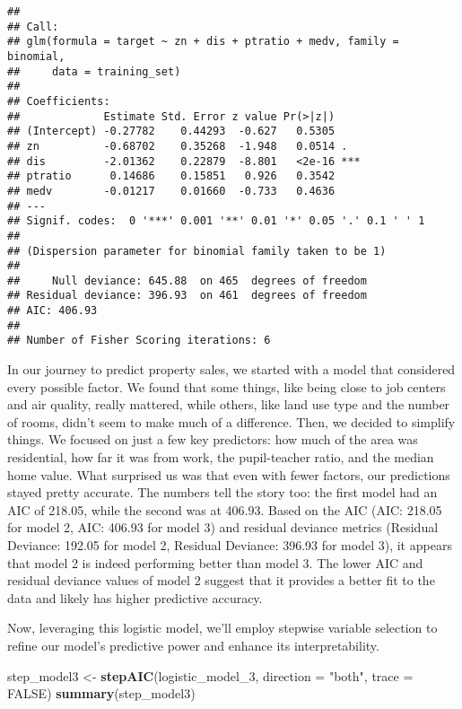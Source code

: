 \documentclass[
]{article}
\newenvironment{Shaded}{\begin{snugshade}}{\end{snugshade}}
\newcommand{\AttributeTok}[1]{\textcolor[rgb]{0.13,0.29,0.53}{#1}}
\newcommand{\ConstantTok}[1]{\textcolor[rgb]{0.56,0.35,0.01}{#1}}
\newcommand{\FunctionTok}[1]{\textcolor[rgb]{0.13,0.29,0.53}{\textbf{#1}}}
\newcommand{\NormalTok}[1]{#1}
\newcommand{\OtherTok}[1]{\textcolor[rgb]{0.56,0.35,0.01}{#1}}
\newcommand{\StringTok}[1]{\textcolor[rgb]{0.31,0.60,0.02}{#1}}
\begin{document}
\begin{verbatim}
## 
## Call:
## glm(formula = target ~ zn + dis + ptratio + medv, family = binomial, 
##     data = training_set)
## 
## Coefficients:
##             Estimate Std. Error z value Pr(>|z|)    
## (Intercept) -0.27782    0.44293  -0.627   0.5305    
## zn          -0.68702    0.35268  -1.948   0.0514 .  
## dis         -2.01362    0.22879  -8.801   <2e-16 ***
## ptratio      0.14686    0.15851   0.926   0.3542    
## medv        -0.01217    0.01660  -0.733   0.4636    
## ---
## Signif. codes:  0 '***' 0.001 '**' 0.01 '*' 0.05 '.' 0.1 ' ' 1
## 
## (Dispersion parameter for binomial family taken to be 1)
## 
##     Null deviance: 645.88  on 465  degrees of freedom
## Residual deviance: 396.93  on 461  degrees of freedom
## AIC: 406.93
## 
## Number of Fisher Scoring iterations: 6
\end{verbatim}

In our journey to predict property sales, we started with a model that
considered every possible factor. We found that some things, like being
close to job centers and air quality, really mattered, while others,
like land use type and the number of rooms, didn't seem to make much of
a difference. Then, we decided to simplify things. We focused on just a
few key predictors: how much of the area was residential, how far it was
from work, the pupil-teacher ratio, and the median home value. What
surprised us was that even with fewer factors, our predictions stayed
pretty accurate. The numbers tell the story too: the first model had an
AIC of 218.05, while the second was at 406.93. Based on the AIC (AIC:
218.05 for model 2, AIC: 406.93 for model 3) and residual deviance
metrics (Residual Deviance: 192.05 for model 2, Residual Deviance:
396.93 for model 3), it appears that model 2 is indeed performing better
than model 3. The lower AIC and residual deviance values of model 2
suggest that it provides a better fit to the data and likely has higher
predictive accuracy.

Now, leveraging this logistic model, we'll employ stepwise variable
selection to refine our model's predictive power and enhance its
interpretability.

\begin{Shaded}
\begin{Highlighting}[]
\NormalTok{step\_model3 }\OtherTok{\textless{}{-}} \FunctionTok{stepAIC}\NormalTok{(logistic\_model\_3, }\AttributeTok{direction =} \StringTok{"both"}\NormalTok{, }\AttributeTok{trace =} \ConstantTok{FALSE}\NormalTok{)}
\FunctionTok{summary}\NormalTok{(step\_model3)}
\end{Highlighting}
\end{Shaded}
\end{document}
